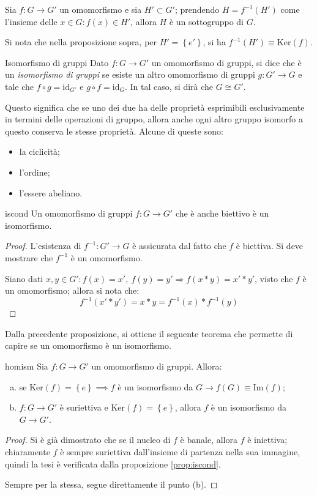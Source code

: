 \documentclass[11pt, a4paper]{scrartcl}
\theoremstyle{definition}
\numberwithin{esempio}{section}
\theoremstyle{definition}
\numberwithin{obs}{section}
\numberwithin{nota}{section}
\numberwithin{equation}{subsection}
\begin{document}
\begin{prop}
	{}{}
	Sia $f:G \to G'$ un omomorfismo e sia $H' \subset G'$; prendendo $H = f^{-1} (H')$ come l'insieme delle $x \in G : f(x) \in H'$, allora $H$ \`e un sottogruppo di $G$.
\end{prop}
\noindent Si nota che nella proposizione sopra, per $H'=\left\{ e' \right\} $, si ha $f^{-1} (H') \equiv \mathrm{Ker} (f)$.
\begin{definizione}
	{Isomorfismo di gruppi}{}
Dato $f:G\to G'$ un omomorfismo di gruppi, si dice che \`e un \textit{isomorfismo di gruppi} se esiste un altro omomorfismo di gruppi $g : G' \to G$ e tale che $f \circ g = \mathrm{id} _{G'} $ e $ g\circ f = \mathrm{id} _{G} $. 
In tal caso, si dir\`a che $G \cong G'$.
\end{definizione}
\noindent Questo significa che se uno dei due ha delle propriet\`a esprimibili esclusivamente in termini delle operazioni di gruppo, allora anche ogni altro gruppo isomorfo a questo conserva le stesse propriet\`a. 
Alcune di queste sono:
\begin{itemize}
	\item la ciclicit\`a;
	\item l'ordine;
	\item l'essere abeliano.
\end{itemize}
\begin{prop}
	{}{iscond}
	Un omomorfismo di gruppi $f: G \to G'$ che \`e anche biettivo \`e un isomorfismo.
	\begin{proof}
		L'esistenza di $f^{-1} :G' \to G$ \`e assicurata dal fatto che $f$ \`e biettiva. Si deve mostrare che $f^{-1} $ \`e un omomorfismo. 

		Siano dati $x, y \in G': f(x) = x' , \ f(y) = y'\Rightarrow f(x*y) = x'*y'$, visto che $f$ \`e un omomorfismo; allora si nota che:
		\[
		f^{-1} (x'*y')= x*y = f^{-1} (x) * f^{-1} (y) 
		\] 
		
	\end{proof}
\end{prop}
\noindent Dalla precedente proposizione, si ottiene il seguente teorema che permette di capire se un omomorfismo \`e un isomorfismo.
\begin{teorema}
	{}{homism}
	Sia $f:G \to G'$ un omomorfismo di gruppi. Allora:
	\begin{enumerate}[(a).]
		\item se $\mathrm{Ker} (f) = \left\{ e \right\} \implies f$ \`e un isomorfismo da $G\to f(G) \equiv \mathrm{Im} (f)$;
		\item $f:G\to G'$ \`e suriettiva e $\mathrm{Ker} (f) = \left\{ e \right\} $, allora $f$ \`e un isomorfismo da $G\to G'$.
	\end{enumerate}
	\begin{proof}
		Si \`e gi\`a dimostrato che se il nucleo di $f$ \`e banale, allora $f$ \`e iniettiva; chiaramente $f$ \`e sempre suriettiva dall'insieme di partenza nella sua immagine, quindi la tesi \`e verificata dalla proposizione \ref{prop:iscond}. 

		Sempre per la stessa, segue direttamente il punto (b).
	\end{proof}
\end{teorema}
\end{document}
